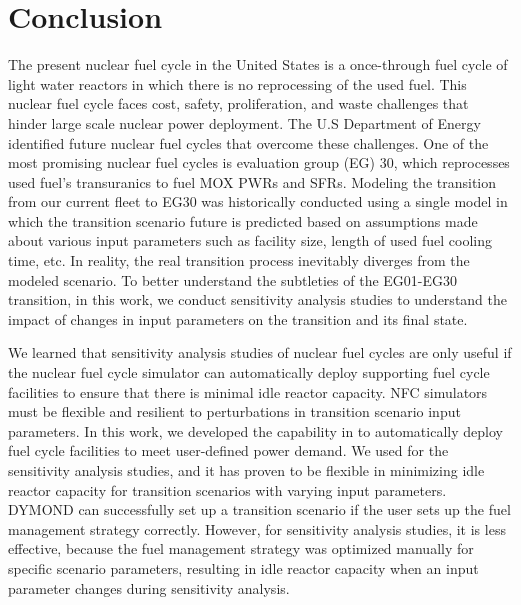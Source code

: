 \chapter{Conclusion}
The present nuclear fuel cycle in the United States is a once-through 
fuel cycle of light water reactors in which there is no reprocessing 
of the used fuel. 
This nuclear fuel cycle faces cost, safety, proliferation, and waste 
challenges that hinder large scale nuclear power deployment. 
The U.S Department of Energy identified future 
nuclear fuel cycles that overcome these challenges.  
One of the most promising nuclear fuel cycles is evaluation group (EG) 30, 
which reprocesses used fuel's transuranics to fuel \gls{MOX} \glspl{PWR}
and \glspl{SFR}. 
Modeling the transition from our current fleet to EG30 was historically 
conducted using a single model in which the transition scenario future 
is predicted based on assumptions made about various input parameters 
such as facility size, length of used fuel cooling time, etc. 
In reality, the real transition process inevitably diverges from the 
modeled scenario. 
To better understand the subtleties of the EG01-EG30 transition,
in this work, we conduct sensitivity analysis studies to 
understand the impact of changes in input parameters on the transition 
and its final state. 

We learned that sensitivity analysis studies of nuclear fuel cycles 
are only useful if the nuclear fuel cycle simulator can 
automatically deploy supporting fuel cycle facilities 
to ensure that there is minimal idle reactor capacity. 
NFC simulators must be flexible and resilient to 
perturbations in transition scenario input parameters. 
In this work, we developed the \deploy capability in \Cyclus to 
automatically deploy fuel cycle facilities to meet user-defined 
power demand. 
We used \deploy for the sensitivity analysis studies, and it has 
proven to be flexible in minimizing idle reactor capacity for 
transition scenarios with varying input parameters. 
DYMOND can successfully set up a transition scenario if the 
user sets up the fuel management strategy correctly. 
However, for sensitivity analysis studies, it is less effective, 
because the fuel management strategy was optimized manually for specific 
scenario parameters, resulting in idle reactor capacity when 
an input parameter changes during sensitivity analysis.

